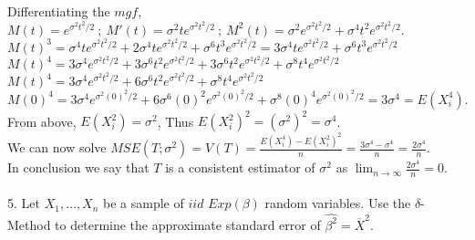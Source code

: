 \documentclass[12pt]{article}
\newcommand{\XB}{\color{black}}
\newcommand{\XBB}{\color{blue}}
\begin{document}
\noindent
Differentiating the $ mgf $, $ \displaystyle M(t) = e^{\sigma^{2}t^{2}/2} \ ; \ M'(t) = \sigma^{2}te^{\sigma^{2}t^{2}/2} \ ; \ M^{2}(t) = \sigma^{2}e^{\sigma^{2}t^{2}/2} + \sigma^{4}t^{2}e^{\sigma^{2}t^{2}/2} $.\\

$ \displaystyle M(t)^{3} = \sigma^{4}te^{\sigma^{2}t^{2}/2} + 2\sigma^{4}te^{\sigma^{2}t^{2}/2} + \sigma^{6}t^{3}e^{\sigma^{2}t^{2}/2} = 3\sigma^{4}te^{\sigma^{2}t^{2}/2} + \sigma^{6}t^{3}e^{\sigma^{2}t^{2}/2} $ \\

$ \displaystyle M(t)^{4} = 3\sigma^{4}e^{\sigma^{2}t^{2}/2} + 3\sigma^{6}t^{2}e^{\sigma^{2}t^{2}/2} + 3\sigma^{6}t^{2}e^{\sigma^{2}t^{2}/2} + \sigma^{8}t^{4}e^{\sigma^{2}t^{2}/2} $ \\

$ \displaystyle M(t)^{4} = 3\sigma^{4}e^{\sigma^{2}t^{2}/2} + 6\sigma^{6}t^{2}e^{\sigma^{2}t^{2}/2} + \sigma^{8}t^{4}e^{\sigma^{2}t^{2}/2} $ \\

$ \displaystyle M(0)^{4} = 3\sigma^{4}e^{\sigma^{2}(0)^{2}/2} + 6\sigma^{6}(0)^{2}e^{\sigma^{2}(0)^{2}/2} + \sigma^{8}(0)^{4}e^{\sigma^{2}(0)^{2}/2} = 3\sigma^{4} = E(X_{i}^{4}). $ \\

\noindent
From above, $ E(X_{i}^{2}) = \sigma^{2} $, Thus $ E(X_{i}^{2})^{2} = (\sigma^{2})^{2} = \sigma^{4} $. \\ 

\noindent
We can now solve $ \displaystyle MSE(T; \sigma^{2}) = V(T) = \frac{E(X_{i}^{4}) - E(X_{i}^{2})^{2}}{n} = \frac{3\sigma^{4} - \sigma^{4}}{n} = \frac{2\sigma^{4}}{n} $. \\

\noindent
In conclusion we say that $ T $ is a consistent estimator of $ \sigma^{2} $ as $ \displaystyle \lim_{n \to \infty} \frac{2\sigma^{4}}{n} = 0 $. \\  

\newpage
\XBB\hrulefill\XB \\

5. Let $ X_{1}, \dots, X_{n} $ be a sample of $ iid $ $ Exp(\beta) $ random variables. Use the $ \delta $-Method to determine the approximate standard error of $ \hat{\beta^{2}} = \overline{X}^{2} $. \\

\XBB\hrulefill\XB 
\vspace{5mm} \\
\end{document}
